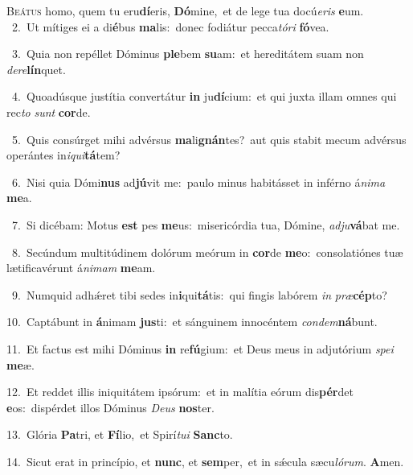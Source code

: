 \lettrine{\initial\textcolor{\initialcolor}{B}}{eátus} homo, quem tu eru\-\textbf{dí}\-eris, \textbf{Dó}\-mine,~\star et de lege tua docú\-\textit{e}\-\textit{ris} \textbf{e}\-um.\\
{\numbfont\textcolor{\numbcolor}{~2.}}~Ut mítiges ei a di\-\textbf{é}\-bus \textbf{ma}\-lis:~\star donec fodiátur pecca\-\textit{tó}\-\textit{ri} \textbf{fó}\-vea.\par
{\numbfont\textcolor{\numbcolor}{~3.}}~Quia non repéllet Dóminus \textbf{ple}\-bem \textbf{su}\-am:~\star et hereditátem suam non \textit{de}\-\textit{re}\textbf{lín}quet.\par
{\numbfont\textcolor{\numbcolor}{~4.}}~Quoadúsque justítia convertátur \textbf{in} ju\-\textbf{dí}\-cium:~\star et qui juxta illam omnes qui rec\textit{to} \textit{sunt} \textbf{cor}\-de.\par
{\numbfont\textcolor{\numbcolor}{~5.}}~Quis consúrget mihi advérsus \textbf{ma}\-li\-\textbf{gnán}\-tes?~\star aut quis stabit mecum advérsus operántes in\-\textit{i}\-\textit{qui}\textbf{tá}tem?\par
{\numbfont\textcolor{\numbcolor}{~6.}}~Nisi quia Dómi\textbf{nus} ad\-\textbf{jú}\-vit me:~\star paulo minus habitásset in inférno á\-\textit{ni}\-\textit{ma} \textbf{me}\-a.\par
{\numbfont\textcolor{\numbcolor}{~7.}}~Si dicébam: Motus \textbf{est} pes \textbf{me}\-us:~\star misericórdia tua, Dómine, \textit{ad}\-\textit{ju}\textbf{vá}bat me.\par
{\numbfont\textcolor{\numbcolor}{~8.}}~Secúndum multitúdinem dolórum meórum in \textbf{cor}\-de \textbf{me}\-o:~\star consolatiónes tuæ lætificavérunt á\-\textit{ni}\-\textit{mam} \textbf{me}\-am.\par
{\numbfont\textcolor{\numbcolor}{~9.}}~Numquid adhǽret tibi sedes in\-\textbf{i}\-qui\-\textbf{tá}\-tis:~\star qui fingis labórem \textit{in} \textit{præ}\-\textbf{cép}to?\par
{\numbfont\textcolor{\numbcolor}{10.}}~Captábunt in \textbf{á}\-nimam \textbf{jus}\-ti:~\star et sánguinem innocéntem \textit{con}\-\textit{dem}\textbf{ná}bunt.\par
{\numbfont\textcolor{\numbcolor}{11.}}~Et factus est mihi Dóminus \textbf{in} re\-\textbf{fú}\-gium:~\star et Deus meus in adjutórium \textit{spe}\-\textit{i} \textbf{me}\-æ.\par
{\numbfont\textcolor{\numbcolor}{12.}}~Et reddet illis iniquitátem ipsórum:~\dagger et in malítia eórum dis\-\textbf{pér}\-det \textbf{e}\-os:~\star dispérdet illos Dóminus \textit{De}\-\textit{us} \textbf{nos}\-ter.\par
{\numbfont\textcolor{\numbcolor}{13.}}~Glória \textbf{Pa}\-tri, et \textbf{Fí}\-lio,~\star et Spirí\-\textit{tu}\-\textit{i} \textbf{Sanc}\-to.\par
{\numbfont\textcolor{\numbcolor}{14.}}~Sicut erat in princípio, et \textbf{nunc}\-, et \textbf{sem}\-per,~\star et in sǽcula sæcu\-\textit{ló}\-\textit{rum}. \textbf{A}\-men.\par
